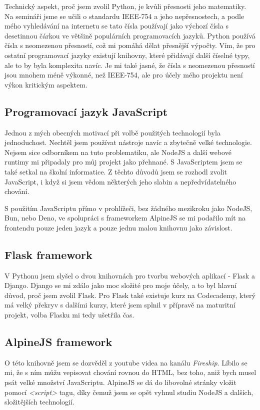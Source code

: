 \documentclass[11pt,a4paper,twoside,openright]{report}
\begin{document}
Technický aspekt, proč jsem zvolil Python, je kvůli přesnosti jeho matematiky. Na semináři jsme se učili o
standardu IEEE-754 a jeho nepřesnostech, a podle mého vyhledávání na internetu se tato čísla používají jako
výchozí čísla s desetinnou čárkou ve většině populárních programovacích jazyků. Python používá čísla s
neomezenou přesností, což mi pomáhá dělat přesnější výpočty. Vím, že pro ostatní programovací jazyky existují
knihovny, které přidávají další číselné typy, ale to by byla komplexita navíc. Je mi také jasné, že čísla
s neomezenou přesností jsou mnohem méně výkonné, než IEEE-754, ale pro účely mého projektu není výkon kritickým
aspektem.

\subsection{Programovací jazyk JavaScript}
Jednou z mých obecných motivací při volbě použitých technologií byla jednoduchost. Nechtěl jsem používat
nástroje navíc a zbytečně velké technologie. Nejsem sice odborníkem na tuto problematiku, ale NodeJS a další
webové runtimy mi připadaly pro můj projekt jako přehnané. S JavaScriptem jsem se také setkal na školní informatice.
Z těchto důvodů jsem se rozhodl zvolit JavaScript, i když si jsem vědom některých jeho slabin a nepředvídatelného
chování.

S použitím JavaScriptu přímo v prohlížeči, bez žádného mezikroku jako NodeJS, Bun, nebo Deno, ve spolupráci
s frameworkem AlpineJS se mi podařilo mít na frontendu pouze jeden jazyk a pouze
jednu malou knihovnu jako závislost.

\subsection{Flask framework}
V Pythonu jsem slyšel o dvou knihovnách pro tvorbu webových aplikací - Flask a Django. Django se mi zdálo
jako moc složité pro moje účely, a to byl hlavní důvod, proč jsem zvolil Flask. Pro Flask také existuje
kurz na Codecademy, který má velký překryv s dalšími kurzy, které jsem splnil v přípravě na maturitní projekt,
volba Flasku mi tedy ušetřila čas.

\subsection{AlpineJS framework}
O této knihovně jsem se dozvěděl z youtube videa na kanálu \emph{Fireship}. Líbilo se mi, že s ním můžu
vepisovat chování rovnou do HTML, bez toho, aniž bych musel psát velké množství JavaScriptu. AlpineJS se
dá do libovolné stránky vložit pomocí \emph{<script>} tagu, díky čemuž jsem se opět vyhnul studiu NodeJS
a dalších, složitějších technologií.
\end{document}
